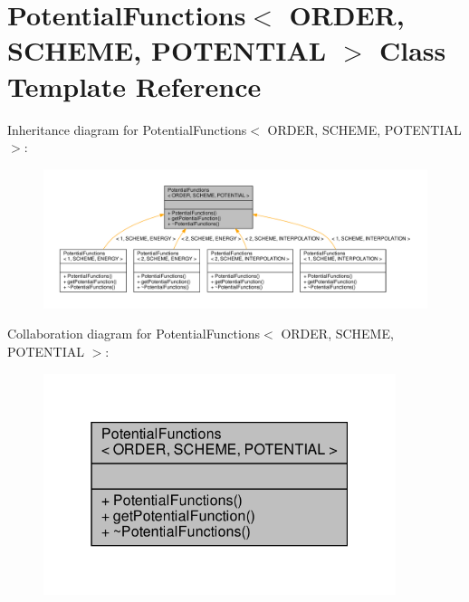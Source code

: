 \hypertarget{classPotentialFunctions}{}\section{Potential\+Functions$<$ O\+R\+D\+ER, S\+C\+H\+E\+ME, P\+O\+T\+E\+N\+T\+I\+AL $>$ Class Template Reference}
\label{classPotentialFunctions}


Inheritance diagram for Potential\+Functions$<$ O\+R\+D\+ER, S\+C\+H\+E\+ME, P\+O\+T\+E\+N\+T\+I\+AL $>$\+:\nopagebreak
\begin{figure}[H]
\begin{center}
\leavevmode
\includegraphics[width=350pt]{classPotentialFunctions__inherit__graph}
\end{center}
\end{figure}


Collaboration diagram for Potential\+Functions$<$ O\+R\+D\+ER, S\+C\+H\+E\+ME, P\+O\+T\+E\+N\+T\+I\+AL $>$\+:\nopagebreak
\begin{figure}[H]
\begin{center}
\leavevmode
\includegraphics[width=292pt]{classPotentialFunctions__coll__graph}
\end{center}
\end{figure}
